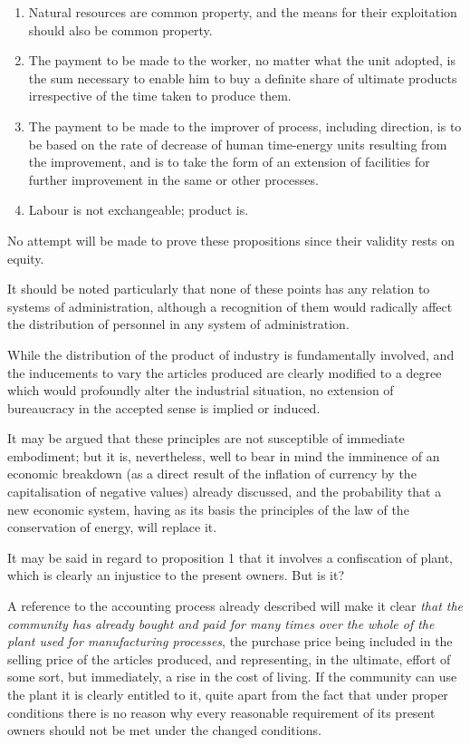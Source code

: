 \documentclass{book}
\begin{document}
\begin{enumerate}
	\item Natural resources are common property, and the means for their exploitation should also be common property.


	\item The payment to be made to the worker, no matter what the unit adopted, is the sum necessary to enable him to buy a definite share of ultimate products irrespective of the time taken to produce them.


	\item The payment to be made to the improver of process, including direction, is to be based on the rate of decrease of human time-energy units resulting from the improvement, and is to take the form of an extension of facilities for further improvement in the same or other processes.


	\item Labour is not exchangeable; product is.



\end{enumerate}
No attempt will be made to prove these propositions since their validity rests on equity.

It should be noted particularly that none of these points has any relation to systems of administration, although a recognition of them would radically affect the distribution of personnel in any system of administration.

While the distribution of the product of industry is fundamentally involved, and the inducements to vary the articles produced are clearly modified to a degree which would profoundly alter the industrial situation, no extension of bureaucracy in the accepted sense is implied or induced.

It may be argued that these principles are not susceptible of immediate embodiment; but it is, nevertheless, well to bear in mind the imminence of an economic breakdown (as a direct result of the inflation of currency by the capitalisation of negative values) already discussed, and the probability that a new economic system, having as its basis the principles of the law of the conservation of energy, will replace it.

It may be said in regard to proposition 1 that it involves a confiscation of plant, which is clearly an injustice to the present owners. But is it?

A reference to the accounting process already described will make it clear \emph{that the community has already bought and paid for many times over the whole of the plant used for manufacturing processes}, the purchase price being included in the selling price of the articles produced, and representing, in the ultimate, effort of some sort, but immediately, a rise in the cost of living. If the community can use the plant it is clearly entitled to it, quite apart from the fact that under proper conditions there is no reason why every reasonable requirement of its present owners should not be met under the changed conditions.
\end{document}
